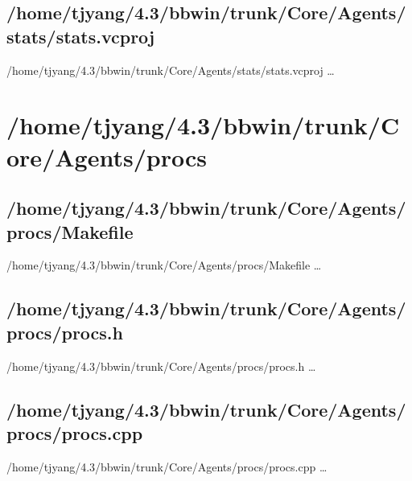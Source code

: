 \subsection{/home/tjyang/4.3/bbwin/trunk/Core/Agents/stats/stats.vcproj}
\lstset{numberstyle=\tiny,numbers=left,
   breaklines=true,
   stepnumber=1,numbersep=5pt,firstnumber=1,
   xleftmargin=12pt,showstringspaces=false}
\noindent /home/tjyang/4.3/bbwin/trunk/Core/Agents/stats/stats.vcproj  \ldots



\section{/home/tjyang/4.3/bbwin/trunk/Core/Agents/procs}

\subsection{/home/tjyang/4.3/bbwin/trunk/Core/Agents/procs/Makefile}
\lstset{numberstyle=\tiny,numbers=left,
   breaklines=true,
   stepnumber=1,numbersep=5pt,firstnumber=1,
   xleftmargin=12pt,showstringspaces=false}
\noindent /home/tjyang/4.3/bbwin/trunk/Core/Agents/procs/Makefile  \ldots





\subsection{/home/tjyang/4.3/bbwin/trunk/Core/Agents/procs/procs.h}
\lstset{numberstyle=\tiny,numbers=left,
   breaklines=true,
   stepnumber=1,numbersep=5pt,firstnumber=1,
   xleftmargin=12pt,showstringspaces=false}
\noindent /home/tjyang/4.3/bbwin/trunk/Core/Agents/procs/procs.h  \ldots



\subsection{/home/tjyang/4.3/bbwin/trunk/Core/Agents/procs/procs.cpp}
\lstset{numberstyle=\tiny,numbers=left,
   breaklines=true,
   stepnumber=1,numbersep=5pt,firstnumber=1,
   xleftmargin=12pt,showstringspaces=false}
\noindent /home/tjyang/4.3/bbwin/trunk/Core/Agents/procs/procs.cpp  \ldots



